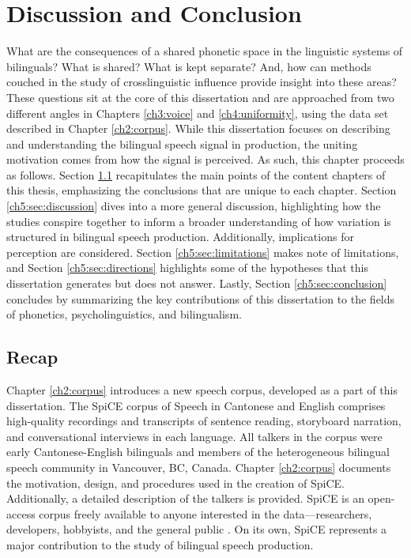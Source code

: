 
\chapter{Discussion and Conclusion}\label{ch5:discussion}

What are the consequences of a shared phonetic space in the linguistic systems of bilinguals? What is shared? What is kept separate? And, how can methods couched in the study of crosslinguistic influence provide insight into these areas? These questions sit at the core of this dissertation and are approached from two different angles in Chapters \ref{ch3:voice} and \ref{ch4:uniformity}, using the data set described in Chapter \ref{ch2:corpus}. While this dissertation focuses on describing and understanding the bilingual speech signal in production, the uniting motivation comes from how the signal is perceived. As such, this chapter proceeds as follows. Section \ref{ch5:sec:recap} recapitulates the main points of the content chapters of this thesis, emphasizing the conclusions that are unique to each chapter. Section \ref{ch5:sec:discussion} dives into a more general discussion, highlighting how the studies conspire together to inform a broader understanding of how variation is structured in bilingual speech production. Additionally, implications for perception are considered. Section \ref{ch5:sec:limitations} makes note of limitations, and Section \ref{ch5:sec:directions} highlights some of the hypotheses that this dissertation generates but does not answer. Lastly, Section \ref{ch5:sec:conclusion} concludes by summarizing the key contributions of this dissertation to the fields of phonetics, psycholinguistics, and bilingualism.

\section{Recap}\label{ch5:sec:recap}

Chapter \ref{ch2:corpus} introduces a new speech corpus, developed as a part of this dissertation. The SpiCE corpus of Speech in Cantonese and English comprises high-quality recordings and transcripts of sentence reading, storyboard narration, and conversational interviews in each language. All talkers in the corpus were early Cantonese-English bilinguals and members of the heterogeneous bilingual speech community in Vancouver, BC, Canada. Chapter \ref{ch2:corpus} documents the motivation, design, and procedures used in the creation of SpiCE. Additionally, a detailed description of the talkers is provided. SpiCE is an open-access corpus freely available to anyone interested in the data---researchers, developers, hobbyists, and the general public \citep{johnson_2021_spice}. On its own, SpiCE represents a major contribution to the study of bilingual speech production. 

